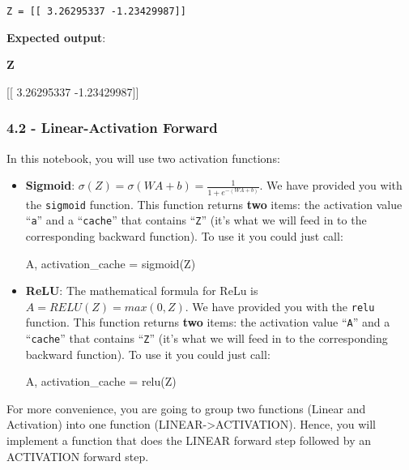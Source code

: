 \documentclass[11pt]{article}
\newenvironment{Shaded}{}{}
\newcommand{\NormalTok}[1]{{#1}}
\begin{document}
    \begin{Verbatim}[commandchars=\\\{\}]
Z = [[ 3.26295337 -1.23429987]]

    \end{Verbatim}

    \textbf{Expected output}:

\textbf{Z}

{[}{[} 3.26295337 -1.23429987{]}{]}

    \subsubsection{4.2 - Linear-Activation
Forward}\label{linear-activation-forward}

In this notebook, you will use two activation functions:

\begin{itemize}
\item
  \textbf{Sigmoid}:
  $\sigma(Z) = \sigma(W A + b) = \frac{1}{ 1 + e^{-(W A + b)}}$. We have
  provided you with the \texttt{sigmoid} function. This function returns
  \textbf{two} items: the activation value ``\texttt{a}'' and a
  ``\texttt{cache}'' that contains ``\texttt{Z}'' (it's what we will
  feed in to the corresponding backward function). To use it you could
  just call:

\begin{Shaded}
\begin{Highlighting}[]
\NormalTok{A, activation_cache = sigmoid(Z)}
\end{Highlighting}
\end{Shaded}
\item
  \textbf{ReLU}: The mathematical formula for ReLu is
  $A = RELU(Z) = max(0, Z)$. We have provided you with the \texttt{relu}
  function. This function returns \textbf{two} items: the activation
  value ``\texttt{A}'' and a ``\texttt{cache}'' that contains
  ``\texttt{Z}'' (it's what we will feed in to the corresponding
  backward function). To use it you could just call:

\begin{Shaded}
\begin{Highlighting}[]
\NormalTok{A, activation_cache = relu(Z)}
\end{Highlighting}
\end{Shaded}
\end{itemize}

    For more convenience, you are going to group two functions (Linear and
Activation) into one function (LINEAR-\textgreater{}ACTIVATION). Hence,
you will implement a function that does the LINEAR forward step followed
by an ACTIVATION forward step.
\end{document}
